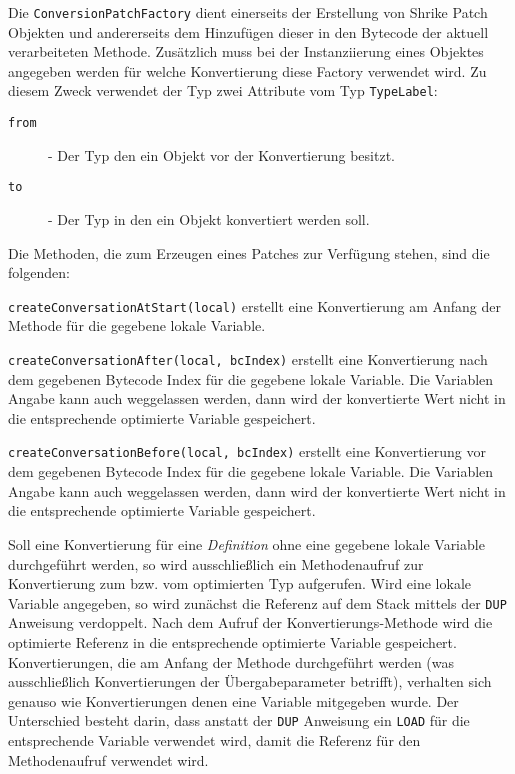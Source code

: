 Die \texttt{ConversionPatchFactory} dient einerseits der Erstellung von Shrike Patch 
Objekten und andererseits dem Hinzufügen dieser
in den Bytecode der aktuell verarbeiteten Methode. Zusätzlich muss bei der Instanziierung eines Objektes 
angegeben werden für welche Konvertierung diese Factory verwendet wird. Zu diesem Zweck verwendet der Typ zwei 
Attribute vom Typ \texttt{TypeLabel}:

\begin{description}
	\item[\texttt{from}] - Der Typ den ein Objekt vor der Konvertierung besitzt.
	\item[\texttt{to}] - Der Typ in den ein Objekt konvertiert werden soll.
\end{description}

Die Methoden, die zum Erzeugen eines Patches zur Verfügung stehen, sind die folgenden:

\begin{description}
	\item{\texttt{createConversationAtStart(local)}} erstellt eine Konvertierung am Anfang der Methode
	für die gegebene lokale Variable.
	\item{\texttt{createConversationAfter(local, bcIndex)}} erstellt eine Konvertierung nach dem gegebenen
	Bytecode Index für die gegebene lokale Variable. Die Variablen Angabe kann auch weggelassen werden, 
	dann wird der konvertierte Wert nicht in die entsprechende optimierte Variable gespeichert.
	\item{\texttt{createConversationBefore(local, bcIndex)}} erstellt eine Konvertierung vor dem gegebenen
	Bytecode Index für die gegebene lokale Variable. Die Variablen Angabe kann auch weggelassen werden, 
	dann wird der konvertierte Wert nicht in die entsprechende optimierte Variable gespeichert.
\end{description}

Soll eine Konvertierung für eine \textit{Definition} ohne eine gegebene lokale Variable durchgeführt werden, so 
wird ausschließlich ein Methodenaufruf zur Konvertierung zum bzw. vom optimierten Typ aufgerufen. Wird eine 
lokale Variable angegeben, so wird zunächst die Referenz auf dem Stack mittels der \texttt{DUP} Anweisung 
verdoppelt. Nach dem Aufruf der Konvertierungs-Methode wird die optimierte Referenz in die entsprechende 
optimierte Variable gespeichert. Konvertierungen, die am Anfang der Methode durchgeführt werden (was 
ausschließlich Konvertierungen der Übergabeparameter betrifft), verhalten sich genauso wie 
Konvertierungen denen eine Variable mitgegeben wurde. Der Unterschied besteht darin, dass anstatt der 
\texttt{DUP} Anweisung ein \texttt{LOAD} für die entsprechende Variable verwendet wird, damit die 
Referenz für den Methodenaufruf verwendet wird.

